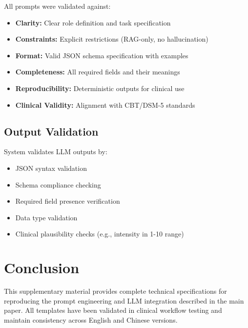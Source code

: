 \documentclass[sigconf,review,anonymous]{acmart}
\begin{document}
All prompts were validated against:

\begin{itemize}
\item \textbf{Clarity:} Clear role definition and task specification
\item \textbf{Constraints:} Explicit restrictions (RAG-only, no hallucination)
\item \textbf{Format:} Valid JSON schema specification with examples
\item \textbf{Completeness:} All required fields and their meanings
\item \textbf{Reproducibility:} Deterministic outputs for clinical use
\item \textbf{Clinical Validity:} Alignment with CBT/DSM-5 standards
\end{itemize}

\subsection{Output Validation}

System validates LLM outputs by:

\begin{itemize}
\item JSON syntax validation
\item Schema compliance checking
\item Required field presence verification
\item Data type validation
\item Clinical plausibility checks (e.g., intensity in 1-10 range)
\end{itemize}

\section{Conclusion}

This supplementary material provides complete technical specifications for reproducing the prompt engineering and LLM integration described in the main paper. All templates have been validated in clinical workflow testing and maintain consistency across English and Chinese versions.
\end{document}
